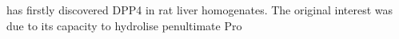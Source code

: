 \citet{Hopsu-Havu1966} has firstly discovered DPP4 in rat liver homogenates. The original interest was due to its capacity to hydrolise penultimate Pro